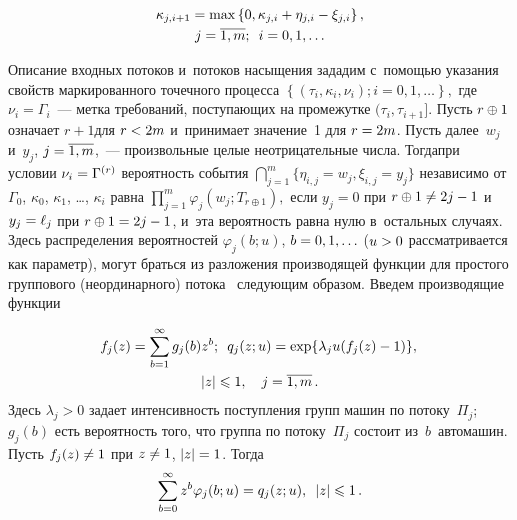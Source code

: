\begin{multicols}{2}
\noindent
\begin{multline*}
\kappa_{j,i+1}= \max\left\{0, \kappa_{j,i}+\eta_{j,i}-\xi_{j,i}\right\}, \\ 
j=\overline{1,m};\enskip i=0,1,\ldots
\end{multline*}

\vspace*{-3pt}

\noindent
Описание входных потоков и~потоков насыщения зададим с~помощью указания свойств
маркированного точечного процесса
$\left\{(\tau_i, \kappa_i, \nu_i); i=0, 1, \ldots\right\},
$
где $\nu_i=\Gamma_i$~--- метка требований, поступающих на промежутке
$(\tau_i, \tau_{i+1}]$. Пусть $r \hm\oplus 1$ означает $r+1$\linebreak для $r\hm<2m$ и~принимает
значение~1 для $r\hm=2m$. Пусть далее~$w_j$ и~$y_j$, $j\hm=\overline{1, m}$,~---
произ\-вольные целые неотрицательные числа. Тогда\linebreak при условии
$\nu_{i}\hm=\Gamma^{(r)}$ вероятность события
$\bigcap\nolimits_{j=1}^m \{ \eta_{i,j}=w_j, \xi_{i,j}=y_j\}
$ %
независимо от $\Gamma_0$, $\kappa_0$, $\kappa_1$, \ldots, $\kappa_{i}$ равна
$
\prod\nolimits_{j=1}^m \varphi_j(w_j; T_{r\oplus1}),
$
если $y_j=0$ при $r\oplus1\hm\neq 2j-1$ и~$y_j\hm=\ell_j$ при $r\hm \oplus1\hm=2j-1$, и~эта
вероятность равна нулю в~остальных случаях. Здесь распределения вероятностей
$\varphi_j(b;u)$, $b\hm=0, 1, \ldots$ ($u\hm>0$ рассматривается как параметр), могут
браться из разложения производящей функции для простого группового
(неординарного) потока~\cite{Ivchenko:Kashtanov:Kovalenko} следующим
образом. Введем производящие функции

\vspace*{-6pt}

\noindent
\begin{multline*}
\!f_j(z)=\sum\limits_{b=1}^\infty g_j(b) z^b;
\enskip
q_j(z;u)= \exp\{ \lambda_j u (
f_j(z) -1) \},\\  |z|\leqslant1,\quad j=\overline{1,  m}\,.
\end{multline*}
Здесь $\lambda_j>0$ задает интенсивность поступления групп машин по потоку~$\Pi_j$; $g_j(b)$ есть вероятность того, что группа по потоку~$\Pi_j$ состоит
из~$b$~автомашин. Пусть $f_j(z)\hm\neq1$ при $z\hm\neq1$, $|z|\hm=1$. Тогда
\begin{equation*}
\sum\limits_{b=0}^\infty z^b \varphi_j(b; u) = q_j(z;u), \enskip |z|\leqslant1\,.
\end{equation*}


\end{multicols}
